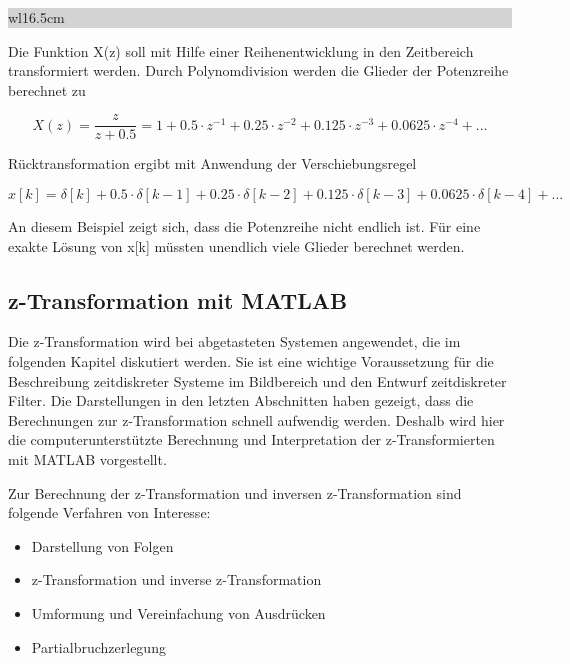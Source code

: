 \noindent
\colorbox{lightgray}{%
%
\renewcommand\arraystretch{0.6}%
\begin{tabular}{ wl{16.5cm} }
{}
\end{tabular}%
}\medskip

\noindent Die Funktion X(z) soll mit Hilfe einer Reihenentwicklung in den Zeitbereich transformiert werden. Durch Polynomdivision werden die Glieder der Potenzreihe berechnet zu

\begin{equation}\label{eq:fiveonehundredtwentyone}
X\left(z\right)=\frac{z}{z+0.5} =1+0.5\cdot z^{-1} +0.25\cdot z^{-2} +0.125\cdot z^{-3} +0.0625\cdot z^{-4} +...
\end{equation}

\noindent R\"{u}cktransformation ergibt mit Anwendung der Verschiebungsregel

\begin{equation}\label{eq:fiveonehundredtwentytwo}
x\left[k\right]=\delta \left[k\right]+0.5\cdot \delta \left[k-1\right]+0.25\cdot \delta \left[k-2\right]+0.125\cdot \delta \left[k-3\right]+0.0625\cdot \delta \left[k-4\right]+...
\end{equation}

\noindent An diesem Beispiel zeigt sich, dass die Potenzreihe nicht endlich ist. F\"{u}r eine exakte L\"{o}sung von x[k] m\"{u}ssten unendlich viele Glieder berechnet werden.

\clearpage

\subsection{z-Transformation mit MATLAB}

\noindent Die z-Transformation wird bei abgetasteten Systemen angewendet, die im folgenden Kapitel diskutiert werden. Sie ist eine wichtige Voraussetzung f\"{u}r die Beschreibung zeitdiskreter Systeme im Bildbereich und den Entwurf zeitdiskreter Filter. Die Darstellungen in den letzten Abschnitten haben gezeigt, dass die Berechnungen zur z-Transformation schnell aufwendig werden. Deshalb wird hier die computerunterst\"{u}tzte Berechnung und Interpretation der z-Transformierten mit MATLAB vorgestellt. \bigskip

\noindent Zur Berechnung der z-Transformation und inversen z-Transformation sind folgende Verfahren von Interesse:

\begin{itemize}
    \item Darstellung von Folgen
    \item z-Transformation und inverse z-Transformation 
    \item Umformung und Vereinfachung von Ausdr\"{u}cken
    \item Partialbruchzerlegung
\end{itemize}

